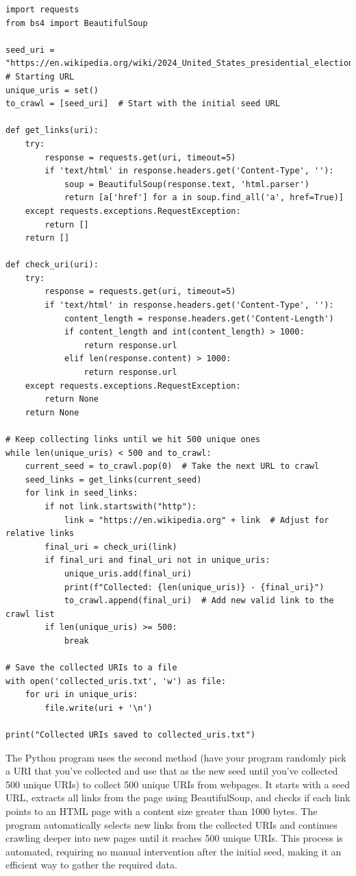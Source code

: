 \documentclass[12pt]{article}
\begin{document}
\begin{lstlisting}
import requests
from bs4 import BeautifulSoup

seed_uri = "https://en.wikipedia.org/wiki/2024_United_States_presidential_election"  # Starting URL
unique_uris = set()
to_crawl = [seed_uri]  # Start with the initial seed URL

def get_links(uri):
    try:
        response = requests.get(uri, timeout=5)
        if 'text/html' in response.headers.get('Content-Type', ''):
            soup = BeautifulSoup(response.text, 'html.parser')
            return [a['href'] for a in soup.find_all('a', href=True)]
    except requests.exceptions.RequestException:
        return []
    return []

def check_uri(uri):
    try:
        response = requests.get(uri, timeout=5)
        if 'text/html' in response.headers.get('Content-Type', ''):
            content_length = response.headers.get('Content-Length')
            if content_length and int(content_length) > 1000:
                return response.url
            elif len(response.content) > 1000:
                return response.url
    except requests.exceptions.RequestException:
        return None
    return None

# Keep collecting links until we hit 500 unique ones
while len(unique_uris) < 500 and to_crawl:
    current_seed = to_crawl.pop(0)  # Take the next URL to crawl
    seed_links = get_links(current_seed)
    for link in seed_links:
        if not link.startswith("http"):
            link = "https://en.wikipedia.org" + link  # Adjust for relative links
        final_uri = check_uri(link)
        if final_uri and final_uri not in unique_uris:
            unique_uris.add(final_uri)
            print(f"Collected: {len(unique_uris)} - {final_uri}")
            to_crawl.append(final_uri)  # Add new valid link to the crawl list
        if len(unique_uris) >= 500:
            break

# Save the collected URIs to a file
with open('collected_uris.txt', 'w') as file:
    for uri in unique_uris:
        file.write(uri + '\n')

print("Collected URIs saved to collected_uris.txt")

\end{lstlisting}

The Python program uses the second method (have your program randomly pick a URI that you've collected and use that as the new seed until you've collected 500 unique URIs) to collect 500 unique URIs from webpages. It starts with a seed URL, extracts all links from the page using BeautifulSoup, and checks if each link points to an HTML page with a content size greater than 1000 bytes. The program automatically selects new links from the collected URIs and continues crawling deeper into new pages until it reaches 500 unique URIs. This process is automated, requiring no manual intervention after the initial seed, making it an efficient way to gather the required data.
\end{document}
